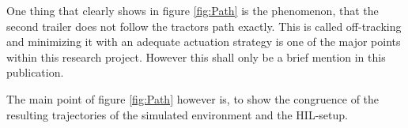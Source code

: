 \documentclass[root.tex]{subfiles}
\begin{document}
	One thing that clearly shows in figure \ref{fig:Path} is the phenomenon, that the second trailer does not follow  the tractors path exactly. This is called off-tracking and minimizing it with an adequate actuation strategy is one of the major points within this research project. However this shall only be a brief mention in this publication. 
	
	The main point of figure \ref{fig:Path} however is, to show the congruence of the resulting trajectories of the simulated environment and the \gls{HIL}-setup. 
	
	
	
	
		
	

	
\end{document}
